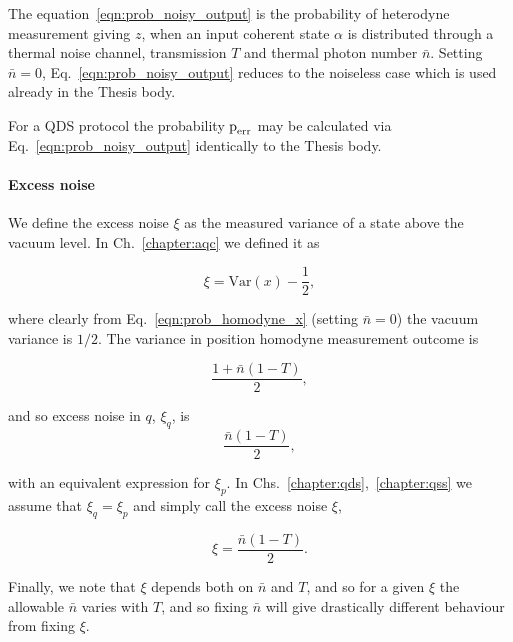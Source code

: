 The equation~\ref{eqn:prob_noisy_output} is the probability of heterodyne measurement giving $z$, when an input coherent state $\alpha$ is distributed through a thermal noise channel, transmission $T$ and thermal photon number $\bar{n}$. Setting $\bar{n}=0$, Eq.~\ref{eqn:prob_noisy_output} reduces to the noiseless case which is used already in the Thesis body. 

For a QDS protocol the probability $\text{p}_{\text{err}}$ may be calculated via Eq.~\ref{eqn:prob_noisy_output} identically to the Thesis body.

\paragraph{Excess noise}
We define the excess noise $\xi$ as the measured variance of a state above the vacuum level. In Ch.~\ref{chapter:aqc} we defined it as

\begin{equation}
\xi = \text{Var}\left(x\right) - \frac{1}{2},
\end{equation}

\noindent where clearly from Eq.~\ref{eqn:prob_homodyne_x} (setting $\bar{n}=0$) the vacuum variance is $1/2$. The variance in position homodyne measurement outcome is

\begin{equation}
\frac{1 + \bar{n}\left(1-T\right)}{2},
\end{equation}

\noindent and so excess noise in $q$, $\xi_q$, is
\begin{equation}
\frac{\bar{n}\left(1-T\right)}{2},
\end{equation}

\noindent with an equivalent expression for $\xi_p$. In Chs.~\ref{chapter:qds},~\ref{chapter:qss} we assume that $\xi_q = \xi_p$ and simply call the excess noise $\xi$,

\begin{equation}\label{eqn:excess_noise}
\xi = \frac{\bar{n}\left(1-T\right)}{2}.
\end{equation}

\noindent Finally, we note that $\xi$ depends both on $\bar{n}$ and $T$, and so for a given $\xi$ the allowable $\bar{n}$ varies with $T$, and so fixing $\bar{n}$ will give drastically different behaviour from fixing $\xi$.